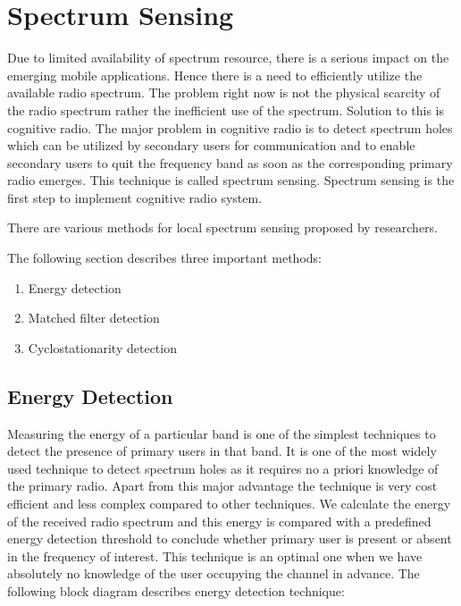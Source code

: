 \chapter{Spectrum Sensing}

Due to limited availability of spectrum resource, there is a serious impact on 
the emerging mobile applications. Hence there is a need to efficiently utilize
the available radio spectrum. The problem right now is not the physical scarcity
of the radio spectrum rather the inefficient use of the spectrum. Solution to 
this is cognitive radio. The major problem in cognitive radio is to detect 
spectrum holes which can be utilized by secondary users for communication and
to enable secondary users to quit the 
frequency band as soon as the corresponding primary radio emerges. This
technique is called spectrum 
sensing. Spectrum sensing is the first step to implement cognitive radio system.

There are various methods for local spectrum sensing proposed by researchers.

The following section describes three important methods:
\begin{enumerate}
	\item Energy detection
	\item Matched filter detection 
	\item Cyclostationarity detection
\end{enumerate}

\section{Energy Detection}

Measuring the energy of a particular band is one of the simplest techniques to 
detect the presence of primary users in that band. It is one of the most widely
used technique to detect spectrum holes as it requires no a priori knowledge of 
the primary radio. Apart from this major advantage the technique is very cost 
efficient and less complex compared to other techniques. 
We calculate the energy of the received radio spectrum and this energy is 
compared with a predefined energy detection threshold to conclude whether 
primary user is present or absent in the frequency of interest. This technique 
is an optimal one when we have absolutely no knowledge of the user occupying the
channel in advance. The following block diagram describes energy detection 
technique:

